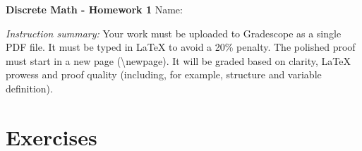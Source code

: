 \documentclass[12pt]{article}
\begin{document}
\begin{center}
    \LARGE{ \textbf{Discrete Math - Homework 1}} \Large \newline
    Name:
\end{center}

\vspace{1em}

\noindent \emph{Instruction summary:} Your work must be uploaded to Gradescope as a single PDF file. It must be typed in LaTeX to avoid a 20\% penalty. The polished proof must start in a new page (\textbackslash{newpage}). It will be graded based on clarity, LaTeX prowess and proof quality (including, for example, structure and variable definition).



\section*{Exercises}
\end{document}

